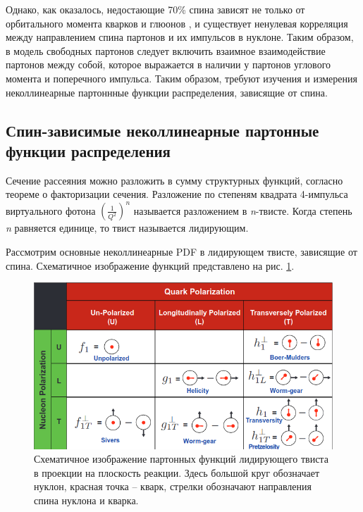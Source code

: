 \documentclass{extreport}
\begin{document}
Однако, как оказалось, недостающие 70\% спина зависят не только от орбитального момента кварков и глюонов \cite{Hagler}, и существует ненулевая корреляция между направлением спина партонов и их импульсов в нуклоне. Таким образом, в модель свободных партонов следует включить взаимное взаимодействие партонов между собой, которое выражается в наличии у партонов углового момента и поперечного импульса. Таким образом, требуют изучения и измерения неколлинеарные партоннные функции распределения, зависящие от спина.


\subsection{Спин-зависимые неколлинеарные партонные функции распределения}

Сечение рассеяния можно разложить в сумму структурных функций, согласно теореме о факторизации сечения. Разложение по степеням квадрата 4-импульса виртуального фотона $(\frac{1}{Q^2})^n$ называется разложением в \textit{n}-твисте. Когда степень \textit{n} равняется единице, то твист называется лидирующим. 

Рассмотрим основные неколлинеарные PDF в лидирующем твисте, зависящие от спина.  Схематичное изображение функций представлено на рис. \ref{fig:functions}.

\begin{figure}[h]
	\centering
	\includegraphics[width=\linewidth]{functions.png}
	\caption{Схематичное изображение партонных функций лидирующего твиста в проекции на плоскость реакции. Здесь большой круг обозначает нуклон, красная точка -- кварк, стрелки обозначают направления спина нуклона и кварка.}
	\label{fig:functions}
\end{figure} 
 
\end{document}
